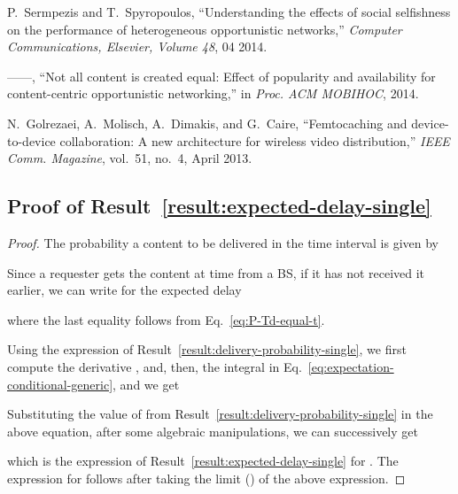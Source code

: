 \documentclass[10pt,conference,letterpaper]{IEEEtran}
\newcommand{\eq}[1]{Eq.~\eqref{#1}}
\begin{document}
\begin{thebibliography}{10}
P.~Sermpezis and T.~Spyropoulos, ``{U}nderstanding the effects of social
  selfishness on the performance of heterogeneous opportunistic networks,''
  \emph{{C}omputer {C}ommunications, {E}lsevier, {V}olume 48}, 04 2014.

------, ``{N}ot all content is created equal: {E}ffect of popularity and
  availability for content-centric opportunistic networking,'' in \emph{Proc.
  ACM MOBIHOC}, 2014.

N.~Golrezaei, A.~Molisch, A.~Dimakis, and G.~Caire, ``Femtocaching and
  device-to-device collaboration: A new architecture for wireless video
  distribution,'' \emph{IEEE Comm. Magazine}, vol.~51, no.~4, April 2013.

\end{thebibliography}




\appendix
\subsection{Proof of Result~\ref{result:expected-delay-single}}\label{appendix:proof-delay}
\begin{proof}
The probability a content to be delivered in the time interval  is given by


Since a requester gets the content at time  from a BS, if it has not received it earlier, we can write for the expected delay

where the last equality follows from \eq{eq:P-Td-equal-t}.

Using the expression of Result~\ref{result:delivery-probability-single}, we first compute the derivative , and, then, the integral in \eq{eq:expectation-conditional-generic}, and we get

Substituting the value of  from Result~\ref{result:delivery-probability-single} in the above equation, after some algebraic manipulations, we can successively get

which is the expression of Result~\ref{result:expected-delay-single} for . The expression for  follows after taking the limit () of the above expression.
\end{proof}
\end{document}
